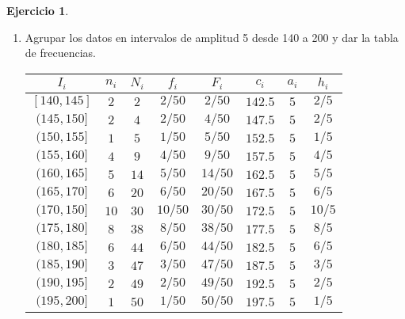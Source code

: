 \documentclass[a4paper, 12pt]{article}
\theoremstyle{definition}
\newtheorem{ej}{Ejercicio}
\begin{document}
\begin{ej}
\begin{enumerate}[label=\textit{\alph*)}]

\item Agrupar los datos en intervalos de amplitud 5 desde 140 a 200 y dar la tabla de frecuencias.

\begin{center}
    
\begin{tabular}{|c|c|c|c|c|c|c|c|}
    \hline
    \(I_i\) & \(n_i\) & \(N_i\) & \(f_i\) & \(F_i\) & \(c_i\) & \(a_i\) & \(h_i\) \\ 
    \hline
    \([140,145]\) & \(2\) & \(2\) & \(2/50\) & \(2/50\) & \(142.5\) & \(5\) & \(2/5\) \\
    \((145,150]\) & \(2\) & \(4\) & \(2/50\) & \(4/50\) & \(147.5\) & \(5\) & \(2/5\) \\
    \((150, 155]\) & \(1\) & \(5\) & \(1/50\) & \(5/50\) & \(152.5\) & \(5\) & \(1/5\) \\
    \((155,160]\) & \(4\) & \(9\) & \(4/50\) & \(9/50\) & \(157.5\) & \(5\) & \(4/5\) \\
    \((160,165]\) & \(5\) & \(14\) & \(5/50\) & \(14/50\) & \(162.5\) & \(5\) & \(5/5\) \\
    \((165,170]\) & \(6\) & \(20\) & \(6/50\) & \(20/50\) & \(167.5\) & \(5\) & \(6/5\) \\
    \((170,150]\) & \(10\) & \(30\) & \(10/50\) & \(30/50\) & \(172.5\) & \(5\) & \(10/5\) \\
    \((175,180]\) & \(8\) & \(38\) & \(8/50\) & \(38/50\) & \(177.5\) & \(5\) & \(8/5\) \\
    \((180,185]\) & \(6\) & \(44\) & \(6/50\) & \(44/50\) & \(182.5\) & \(5\) & \(6/5\) \\
    \((185,190]\) & \(3\) & \(47\) & \(3/50\) & \(47/50\) & \(187.5\) & \(5\) & \(3/5\) \\
    \((190,195]\) & \(2\) & \(49\) & \(2/50\) & \(49/50\) & \(192.5\) & \(5\) & \(2/5\) \\
    \((195,200]\) & \(1\) & \(50\) & \(1/50\) & \(50/50\) & \(197.5\) & \(5\) & \(1/5\) \\
    \hline
\end{tabular}

\end{center}



\end{enumerate}
\end{ej}
\end{document}
